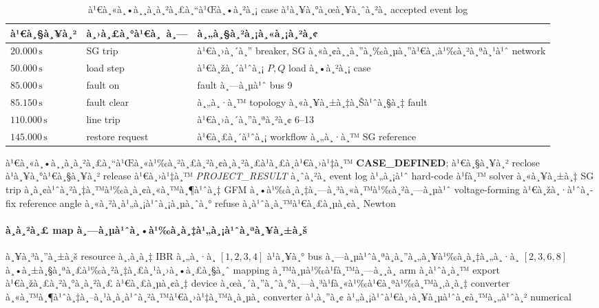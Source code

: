 ﻿\documentclass[12pt,a4paper]{article}
\newcommand{\second}{\ensuremath{\,\mathrm{s}}}
\newcommand{\source}[1]{\textbf{#1}}
\newcommand{\result}[1]{\textit{#1}}
\begin{document}
\begin{table}[H]
\centering
\caption{à¹€à¸«à¸•à¸¸à¸à¸²à¸£à¸“à¹Œà¸•à¸²à¸¡ case à¹à¸¥à¸°à¸œà¸¥à¸ˆà¸²à¸ accepted event log}
\begin{tabularx}{\textwidth}{@{}l l X@{}}
\toprule
à¹€à¸§à¸¥à¸² & à¸›à¸£à¸°à¹€à¸ à¸— & à¸„à¸§à¸²à¸¡à¸«à¸¡à¸²à¸¢ \\
\midrule
$20.000\second$ & SG trip & à¹€à¸›à¸´à¸” breaker, SG à¸«à¸¢à¸¸à¸”à¸‰à¸µà¸”à¹€à¸‚à¹‰à¸²à¸ªà¸¹à¹ˆ network \\
$50.000\second$ & load step & à¹€à¸žà¸´à¹ˆà¸¡ $P,Q$ load à¸•à¸²à¸¡ case \\
$85.000\second$ & fault on & fault à¸—à¸µà¹ˆ bus 9 \\
$85.150\second$ & fault clear & à¸„à¸·à¸™ topology à¸«à¸¥à¸±à¸‡à¸Šà¹ˆà¸§à¸‡ fault \\
$110.000\second$ & line trip & à¹€à¸›à¸´à¸”à¸ªà¸²à¸¢ 6--13 \\
$145.000\second$ & restore request & à¹€à¸£à¸´à¹ˆà¸¡ workflow à¸„à¸·à¸™ SG reference \\
\bottomrule
\end{tabularx}
\end{table}

à¹€à¸«à¸•à¸¸à¸à¸²à¸£à¸“à¹Œà¸«à¹‰à¸²à¸£à¸²à¸¢à¸à¸²à¸£à¹à¸£à¸à¹€à¸›à¹‡à¸™ \source{CASE\_DEFINED}; à¹€à¸§à¸¥à¸² reclose à¹à¸¥à¸°à¹€à¸§à¸¥à¸²
release à¹€à¸›à¹‡à¸™ \result{PROJECT\_RESULT} à¸ˆà¸²à¸ event log à¹„à¸¡à¹ˆ hard-code à¹ƒà¸™ solver
à¸«à¸¥à¸±à¸‡ SG trip à¸­à¸¢à¹ˆà¸²à¸‡à¸™à¹‰à¸­à¸¢à¸«à¸™à¸¶à¹ˆà¸‡ GFM à¸•à¹‰à¸­à¸‡à¸—à¸³à¸«à¸™à¹‰à¸²à¸—à¸µà¹ˆ voltage-forming à¹€à¸žà¸·à¹ˆà¸­ fix
reference angle à¸«à¸²à¸à¹„à¸¡à¹ˆà¸¡à¸µà¸ˆà¸° refuse à¸à¹ˆà¸­à¸™à¹€à¸£à¸µà¸¢à¸ Newton

\paragraph{à¸à¸²à¸£ map à¸—à¸µà¹ˆà¸•à¹‰à¸­à¸‡à¹„à¸¡à¹ˆà¸ªà¸¥à¸±à¸š}
à¸¥à¸³à¸”à¸±à¸š resource à¸‚à¸­à¸‡ IBR à¸„à¸·à¸­ $[1,2,3,4]$ à¹à¸¥à¸° bus à¸—à¸µà¹ˆà¸ªà¸­à¸”à¸„à¸¥à¹‰à¸­à¸‡à¸„à¸·à¸­
$[2,3,6,8]$ à¸•à¸±à¸§à¸ªà¸£à¹‰à¸²à¸‡à¸£à¸¹à¸›à¸•à¸£à¸§à¸ˆ mapping à¸™à¸µà¹‰à¹ƒà¸™à¸—à¸¸à¸ arm à¸à¹ˆà¸­à¸™ export à¹€à¸žà¸£à¸²à¸°à¸à¸²à¸£
à¹€à¸£à¸µà¸¢à¸‡ device à¸œà¸´à¸”à¸ˆà¸°à¸—à¸³à¹ƒà¸«à¹‰à¹€à¸ªà¹‰à¸™à¸‚à¸­à¸‡ converter à¸«à¸™à¸¶à¹ˆà¸‡à¸–à¸¹à¸à¸­à¹ˆà¸²à¸™à¹€à¸›à¹‡à¸™à¸­à¸µà¸ converter à¹‚à¸”à¸¢
à¹„à¸¡à¹ˆà¹€à¸›à¸¥à¸µà¹ˆà¸¢à¸™à¸„à¹ˆà¸² numerical

\par\vspace{5pt}
\end{document}
